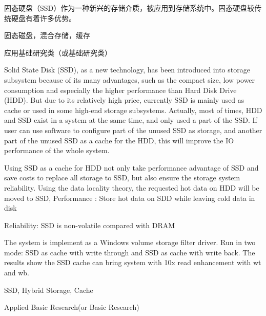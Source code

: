 
\begin{cabstract}

固态硬盘（SSD）作为一种新兴的存储介质，被应用到存储系统中。固态硬盘较传统硬盘有着许多优势。

\end{cabstract}

\begin{ckeywords}
固态磁盘，混合存储，缓存
\end{ckeywords}

\begin{cthesistype}
应用基础研究类（或基础研究类）
\end{cthesistype}


\begin{eabstract}

Solid State Disk (SSD), as a new technology, has been introduced into storage subsystem because of its many advantages, such as the compact size, low power consumption and especially the higher performance than Hard Disk Drive (HDD). But due to its relatively high price, currently SSD is mainly used as cache or used in some high-end storage subsystems. Actually, most of times, HDD and SSD exist in a system at the same time, and only used a part of the SSD. If user can use software to configure part of the unused SSD as storage, and another part of the unused SSD as a cache for the HDD, this will improve the IO performance of the whole system.

Using SSD as a cache for HDD not only take performance advantage of SSD and save costs to replace all storage to SSD, but also ensure the storage system reliability. Using the data locality theory, the requested hot data on HDD will be moved to SSD,
Performance : Store hot data on SDD while leaving cold data in disk

Reliability: SSD is non-volatile compared with DRAM

The system is implement as a Windows volume storage filter driver. Run in two mode: SSD as cache with write through and SSD as cache with write back. The results show the SSD cache can bring system with 10x read enhancement with wt and wb.

\end{eabstract}

\begin{ekeywords}
SSD, Hybrid Storage, Cache
\end{ekeywords}

\begin{ethesistype}
Applied Basic Research(or Basic Research)
\end{ethesistype}


